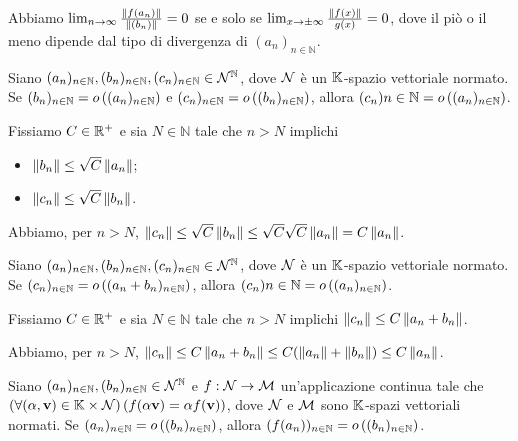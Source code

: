 \Proof Abbiamo $\lim_{n \rightarrow \infty} \frac{\Norm{f(a_n)}}{\Norm{(b_n)}} = 0$ se e solo se $\lim_{x \rightarrow \pm \infty} \frac{\Norm{f(x)}}{g(x)} = 0$, dove il pi\`o o il meno dipende dal tipo di divergenza di $(a_n)_{n \in \mathbb{N}}$. \EndProof
\begin{Theorem}
	Siano $(a_n)_{n \in \mathbb{N}}, (b_n)_{n \in \mathbb{N}}, (c_n)_{n \in \mathbb{N}} \in \mathbb{\mathcal{N}}^\mathbb{N}$, dove $\mathcal{N}$ \`e un $\mathbb{K}$-spazio vettoriale normato. Se $(b_n)_{n \in \mathbb{N}} = o \left ( (a_n)_{n \in \mathbb{N}} \right )$ e $(c_n)_{n \in \mathbb{N}} = o \left ( (b_n)_{n \in \mathbb{N}} \right )$, allora $(c_n){n \in \mathbb{N}} = o \left ( (a_n)_{n \in \mathbb{N}} \right )$.
\end{Theorem}
\Proof Fissiamo $C \in \mathbb{R}^+$ e sia $N \in \mathbb{N}$ tale che $n > N$ implichi
\begin{itemize}
	\item $\Norm{b_n} \leq \sqrt{C} \Norm{a_n}$;
	\item $\Norm{c_n} \leq \sqrt{C} \Norm{b_n}$.
\end{itemize}
\par Abbiamo, per $n > N$, $\Norm{c_n} \leq \sqrt{C} \Norm{b_n} \leq \sqrt{C} \sqrt{C} \Norm{a_n} = C \Norm{a_n}$. \EndProof
\begin{Theorem}
	Siano $(a_n)_{n \in \mathbb{N}}, (b_n)_{n \in \mathbb{N}}, (c_n)_{n \in \mathbb{N}} \in \mathbb{\mathcal{N}}^\mathbb{N}$, dove $\mathcal{N}$ \`e un $\mathbb{K}$-spazio vettoriale normato. Se $(c_n)_{n \in \mathbb{N}} = o \left ( (a_n + b_n)_{n \in \mathbb{N}} \right )$, allora $(c_n){n \in \mathbb{N}} = o \left ( (a_n)_{n \in \mathbb{N}} \right )$.
\end{Theorem}
\Proof Fissiamo $C \in \mathbb{R}^+$ e sia $N \in \mathbb{N}$ tale che $n > N$ implichi $\Norm{c_n} \leq C \Norm{a_n + b_n}$.
\par Abbiamo, per $n > N$, $\Norm{c_n} \leq C \Norm{a_n + b_n} \leq C ( \Norm{a_n} + \Norm{b_n} ) \leq C \Norm{a_n}$. \EndProof
\begin{Theorem}
	Siano $(a_n)_{n \in \mathbb{N}}, (b_n)_{n \in \mathbb{N}} \in \mathbb{\mathcal{N}}^\mathbb{N}$ e $f: \mathcal{N} \rightarrow \mathcal{M}$ un'applicazione continua tale che $\left ( \forall (\alpha,\mathbf{v}) \in \mathbb{K} \times \mathcal{N} \right ) \left ( f(\alpha \mathbf{v}) = \alpha f(\mathbf{v}) \right )$, dove $\mathcal{N}$ e $\mathcal{M}$ sono $\mathbb{K}$-spazi vettoriali normati. Se $(a_n)_{n \in \mathbb{N}} = o \left ( (b_n)_{n \in \mathbb{N}} \right )$, allora $(f(a_n))_{n \in \mathbb{N}} = o \left ( (b_n)_{n \in \mathbb{N}} \right )$.
\end{Theorem}
